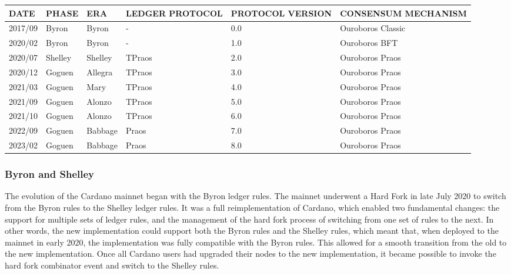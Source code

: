 \begin{tabular}{ ||p{1.25cm}||p{1.5cm}|p{1.5cm}|p{2cm}|p{2cm}|p{3cm}||  }
    \hline
        DATE & PHASE & ERA & LEDGER PROTOCOL & PROTOCOL VERSION & CONSENSUM MECHANISM \\
    \hline\hline
    2017/09 & Byron & Byron & - & 0.0 & Ouroboros Classic \\
    \hline
    2020/02 & Byron & Byron & - & 1.0 & Ouroboros BFT \\
    \hline
    2020/07 & Shelley & Shelley & TPraos & 2.0 & Ouroboros Praos \\
    \hline
    2020/12 & Goguen & Allegra & TPraos & 3.0 & Ouroboros Praos \\
    \hline
    2021/03 & Goguen & Mary & TPraos & 4.0 & Ouroboros Praos \\
    \hline
    2021/09 & Goguen & Alonzo & TPraos & 5.0 & Ouroboros Praos \\
    \hline
    2021/10 & Goguen & Alonzo & TPraos & 6.0 & Ouroboros Praos \\
    \hline
    2022/09 & Goguen & Babbage & Praos & 7.0 & Ouroboros Praos \\
    \hline
    2023/02 & Goguen & Babbage & Praos & 8.0 & Ouroboros Praos \\
    \hline
\end{tabular}

\vspace{0.5cm}

\subsubsection{Byron and Shelley}

The evolution of the Cardano mainnet began with the Byron ledger rules. The mainnet 
underwent a \gls{Hard Fork} in late July 2020 to switch from the Byron rules to the Shelley 
ledger rules. It was a full reimplementation of Cardano, which enabled two fundamental 
changes: the support for multiple sets of ledger rules, and the management of the hard 
fork process of switching from one set of rules to the next. In other words, the new 
implementation could support both the Byron rules and the Shelley rules, which meant that, 
when deployed to the mainnet in early 2020, the implementation was fully compatible with 
the Byron rules. This allowed for a smooth transition from the old to the new implementation. 
Once all Cardano users had upgraded their nodes to the new implementation, it became 
possible to invoke the hard fork combinator event and switch to the Shelley rules.

